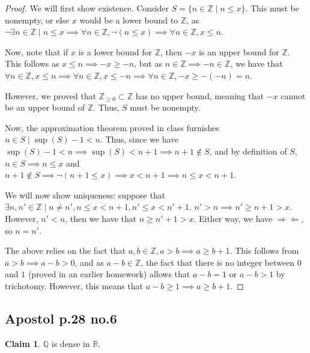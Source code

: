 \documentclass[12pt,letterpaper]{article}
\theoremstyle{definition}
\newtheorem*{claim}{Claim}
\newcommand{\contra}{\Rightarrow\!\Leftarrow}
\newcommand{\R}{\mathbb{R}}
\newcommand{\Z}{\mathbb{Z}}
\newcommand{\Ze}{\mathbb{Z}_{\geq 0}}
\newcommand{\Q}{\mathbb{Q}}
\begin{document}
\begin{proof}
  We will first show existence. Consider $S = \{n \in \Z \mid n \leq x\}$. This
  must be nonempty, or else $x$ would be a lower bound to $\Z$, as $\neg \exists
  n \in \Z \mid n \leq x \implies \forall n \in \Z, \neg(n \leq x) \implies
  \forall n \in \Z, x \leq n$.

  Now, note that if $x$ is a lower bound for $\Z$, then $-x$ is an upper bound
  for $\Z$. This follows as $x \leq n \implies -x \geq -n$, but as $n \in \Z \implies
  -n \in \Z$, we have that $\forall n \in \Z, x \leq n \implies \forall n \in
  \Z, x \leq -n \implies \forall n \in \Z, -x \geq -(-n) = n$.

  However, we proved that $\Ze \subset \Z$ has no upper bound, meaning that $-x$
  cannot be an upper bound of $\Z$. Thus, $S$ must be nonempty.

  Now, the approximation theorem proved in class furnishes $n \in S \mid
  \sup(S) - 1 < n$. Thus, since we have $\sup(S) - 1 < n \implies \sup(S) < n +
  1 \implies n + 1 \notin S$, and by definition of $S$, $n \in S \implies n \leq x$
  and $n+1 \notin S \implies \neg(n + 1 \leq x) \implies x < n + 1 \implies n
  \leq x < n+1$.

  We will now show uniqueness: suppose that $\exists n, n' \in \Z \mid n \neq n', n \leq x
  < n+1, n' \leq x < n'+1$. $n' > n \implies n' \geq n + 1 > x$. However, $n' <
  n$, then we have that $n \geq n' + 1 > x$. Either way, we have $\contra$, so
  $n = n'$.

  The above relies on the fact that $a,b \in \Z, a > b \implies a \geq b + 1$.
  This follows from $a > b \implies a - b > 0$, and as $a - b \in \Z$,
  the fact that there is no integer between $0$ and $1$ (proved in an earlier
  homework) allows that $a - b = 1$ or $a - b > 1$ by trichotomy. However, this
  means that $a-b \geq 1 \implies a \geq b + 1$.
\end{proof}

\subsection*{Apostol p.28 no.6}

\begin{claim}
  $\Q$ is dense in $\R$.
\end{claim}
\end{document}
